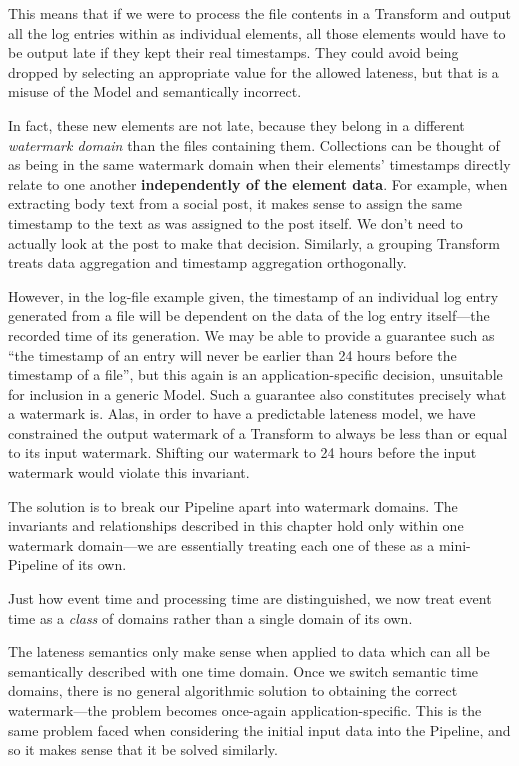 This means that if we were to process the file contents in a Transform and output all the log entries within as individual elements, all those elements would have to be output late if they kept their real timestamps.
They could avoid being dropped by selecting an appropriate value for the allowed lateness, but that is a misuse of the Model and semantically incorrect.

In fact, these new elements are not late, because they belong in a different \emph{watermark domain} than the files containing them.
Collections can be thought of as being in the same watermark domain when their elements' timestamps directly relate to one another \textbf{independently of the element data}.
For example, when extracting body text from a social post, it makes sense to assign the same timestamp to the text as was assigned to the post itself.
We don't need to actually look at the post to make that decision.
Similarly, a grouping Transform treats data aggregation and timestamp aggregation orthogonally.


However, in the log-file example given, the timestamp of an individual log entry generated from a file will be dependent on the data of the log entry itself---the recorded time of its generation.
We may be able to provide a guarantee such as ``the timestamp of an entry will never be earlier than 24 hours before the timestamp of a file'', but this again is an application-specific decision, unsuitable for inclusion in a generic Model.
Such a guarantee also constitutes precisely what a watermark is.
Alas, in order to have a predictable lateness model, we have constrained the output watermark of a Transform to always be less than or equal to its input watermark.
Shifting our watermark to 24 hours before the input watermark would violate this invariant.

The solution is to break our Pipeline apart into watermark domains.
The invariants and relationships described in this chapter hold only within one watermark domain---we are essentially treating each one of these as a mini-Pipeline of its own.

Just how event time and processing time are distinguished, we now treat event time as a \emph{class} of domains rather than a single domain of its own.

The lateness semantics only make sense when applied to data which can all be semantically described with one time domain.
Once we switch semantic time domains, there is no general algorithmic solution to obtaining the correct watermark---the problem becomes once-again application-specific.
This is the same problem faced when considering the initial input data into the Pipeline, and so it makes sense that it be solved similarly.

